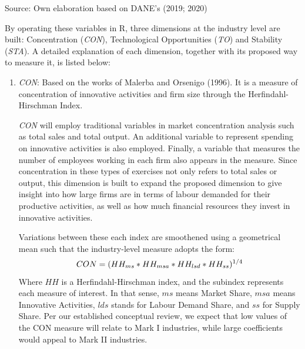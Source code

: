\documentclass[12pt,a4paper]{article}
\begin{document}
\begin{center}
	Source: Own elaboration based on DANE's (2019; 2020)  \\
\end{center}
\vspace{11pt}

 By operating these variables in R, three dimensions at the industry level are built: Concentration (\textit{CON}), Technological Opportunities (\textit{TO}) and Stability (\textit{STA}). A detailed explanation of each dimension, together with its proposed way to measure it, is listed below:  

\begin{enumerate}
	\item \textit{CON}: Based on the works of Malerba and Orsenigo (1996). It is a measure of concentration of innovative activities and firm size through the Herfindahl-Hirschman Index.  
	
	\textit{CON} will employ traditional variables in market concentration analysis such as total sales and total output. An additional variable to represent spending on innovative activities is also employed. Finally, a variable that measures the number of employees working in each firm also appears in the measure. Since concentration in these types of exercises not only refers to total sales or output, this dimension is built to expand the proposed dimension to give insight into how large firms are in terms of labour demanded for their productive activities, as well as how much financial resources they invest in innovative activities. 
	
	Variations between these each index are smoothened using a geometrical mean such that the industry-level measure adopts the form: 
		\begin{equation}
			\centering
			CON = (HH_{ms}*HH_{msa}*HH_{lsd}*HH_{ss})^{1/4}
		\end{equation}
	Where $HH$ is a Herfindahl-Hirschman index, and the subindex represents each measure of interest. In that sense, $ms$ means Market Share, $msa$ means Innovative Activities, $lds$ stands for Labour Demand Share, and $ss$ for Supply Share. Per our established conceptual review, we expect that low values of the CON measure will relate to Mark I industries, while large coefficients would appeal to Mark II industries. 
	

\end{enumerate}
\end{document}
